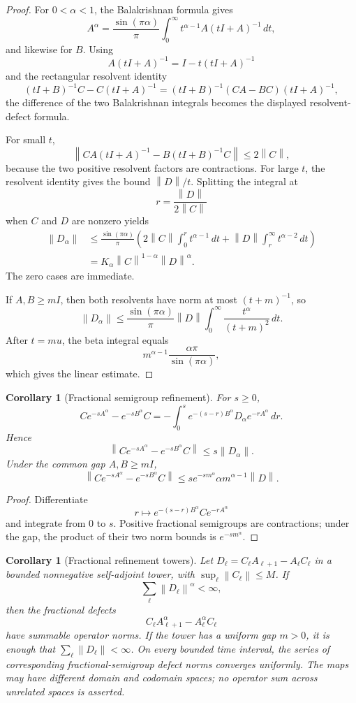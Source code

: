 \documentclass[11pt,a4paper]{article}
\newtheorem{corollary}[theorem]{Corollary}
\theoremstyle{definition}
\theoremstyle{remark}
\newcommand{\norm}[1]{\left\lVert#1\right\rVert}
\begin{document}
\begin{proof}
For $0<\alpha<1$, the Balakrishnan formula gives
\[
A^\alpha
=
\frac{\sin(\pi\alpha)}{\pi}
\int_0^\infty t^{\alpha-1}A(tI+A)^{-1}\,dt,
\]
and likewise for $B$.  Using
\[
A(tI+A)^{-1}=I-t(tI+A)^{-1}
\]
and the rectangular resolvent identity
\[
(tI+B)^{-1}C-C(tI+A)^{-1}
=
(tI+B)^{-1}(CA-BC)(tI+A)^{-1},
\]
the difference of the two Balakrishnan integrals becomes the displayed resolvent-defect formula.

For small $t$,
\[
\norm{CA(tI+A)^{-1}-B(tI+B)^{-1}C}
\le 2\norm C,
\]
because the two positive resolvent factors are contractions.  For large $t$, the resolvent identity gives the bound $\norm D/t$.  Splitting the integral at
\[
r=\frac{\norm D}{2\norm C}
\]
when $C$ and $D$ are nonzero yields
\[
\begin{aligned}
\norm{D_\alpha}
&\le
\frac{\sin(\pi\alpha)}{\pi}
\left(
2\norm C\int_0^r t^{\alpha-1}\,dt
+
\norm D\int_r^\infty t^{\alpha-2}\,dt
\right)\\
&=
K_\alpha\norm C^{1-\alpha}\norm D^\alpha.
\end{aligned}
\]
The zero cases are immediate.

If $A,B\ge mI$, then both resolvents have norm at most $(t+m)^{-1}$, so
\[
\norm{D_\alpha}
\le
\frac{\sin(\pi\alpha)}{\pi}\norm D
\int_0^\infty\frac{t^\alpha}{(t+m)^2}\,dt.
\]
After $t=mu$, the beta integral equals
\[
m^{\alpha-1}\frac{\alpha\pi}{\sin(\pi\alpha)},
\]
which gives the linear estimate.
\end{proof}

\begin{corollary}[Fractional semigroup refinement]\label{core:record:034}\label{core:cor:fractional-semigroup-refinement}
For $s\ge0$,
\[
\boxed{
Ce^{-sA^\alpha}-e^{-sB^\alpha}C
=
-\int_0^s
 e^{-(s-r)B^\alpha}D_\alpha e^{-rA^\alpha}\,dr.
}
\]
Hence
\[
\norm{Ce^{-sA^\alpha}-e^{-sB^\alpha}C}
\le s\norm{D_\alpha}.
\]
Under the common gap $A,B\ge mI$,
\[
\boxed{
\norm{Ce^{-sA^\alpha}-e^{-sB^\alpha}C}
\le
s e^{-sm^\alpha}\alpha m^{\alpha-1}\norm D.
}
\]
\end{corollary}

\begin{proof}
Differentiate
\[
r\longmapsto e^{-(s-r)B^\alpha}Ce^{-rA^\alpha}
\]
and integrate from $0$ to $s$.  Positive fractional semigroups are contractions; under the gap, the product of their two norm bounds is $e^{-sm^\alpha}$.
\end{proof}

\begin{corollary}[Fractional refinement towers]\label{core:record:035}
Let $D_\ell=C_\ell A_{\ell+1}-A_\ell C_\ell$ in a bounded nonnegative self-adjoint tower, with $\sup_\ell\norm{C_\ell}\le M$.  If
\[
\sum_\ell\norm{D_\ell}^{\alpha}<\infty,
\]
then the fractional defects
\[
C_\ell A_{\ell+1}^{\alpha}-A_\ell^{\alpha}C_\ell
\]
have summable operator norms. If the tower has a uniform gap $m>0$, it is enough that $\sum_\ell\norm{D_\ell}<\infty$. On every bounded time interval, the series of corresponding fractional-semigroup defect norms converges uniformly. The maps may have different domain and codomain spaces; no operator sum across unrelated spaces is asserted.
\end{corollary}
\end{document}
